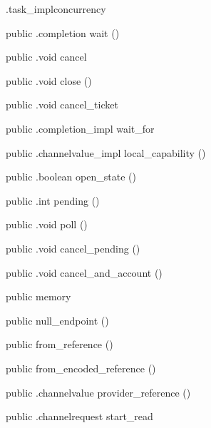 \begin{CrexxClass}{.task\_impl}{concurrency}
\begin{Members}
    \Method
      {public}
      {.completion}
      {wait}
      {()}

    \Method
      {public}
      {.void}
      {cancel}
      {}

    \Method
      {public}
      {.void}
      {close}
      {()}

    \Method
      {public}
      {.void}
      {cancel\_ticket}
      {}

    \Method
      {public}
      {.completion\_impl}
      {wait\_for}
      {}

    \Method
      {public}
      {.channelvalue\_impl}
      {local\_capability}
      {()}

    \Method
      {public}
      {.boolean}
      {open\_state}
      {()}

    \Method
      {public}
      {.int}
      {pending}
      {()}

    \Method
      {public}
      {.void}
      {poll}
      {()}

    \Method
      {public}
      {.void}
      {cancel\_pending}
      {()}

    \Method
      {public}
      {.void}
      {cancel\_and\_account}
      {()}

    \Factory
      {public}
      {memory}
      {}

    \Factory
      {public}
      {null\_endpoint}
      {()}

    \Factory
      {public}
      {from\_reference}
      {()}

    \Factory
      {public}
      {from\_encoded\_reference}
      {()}

    \Method
      {public}
      {.channelvalue}
      {provider\_reference}
      {()}

    \Method
      {public}
      {.channelrequest}
      {start\_read}
      {}


\end{Members}
\end{CrexxClass}
